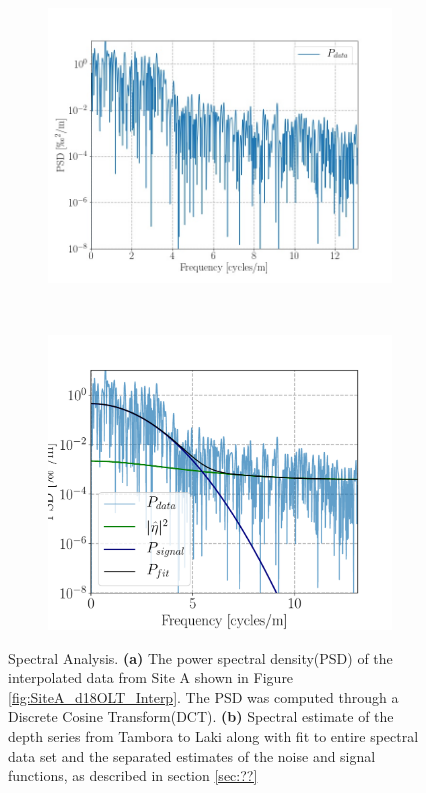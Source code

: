 \documentclass[../../CompleteThesis/Complete_1stDraft.tex]{subfiles}
\begin{document}
\begin{figure}[h]
	\centering
	\begin{subfigure}{.45\textwidth}
		\centering
		\includegraphics[width=\textwidth]{SiteA_DCT_PSD_raw.jpg}
		\caption[PSD of LT data, Site A]{}
		\label{fig:SiteA_DCT_PSD_raw}
	\end{subfigure}
	~
	\begin{subfigure}{0.45\textwidth}
		\includegraphics[width=\textwidth]{SiteA_PSD_all}
		\caption[Spectral fit, Site A]{}%
		\label{fig:SiteA_SpectralFitsAll}
	\end{subfigure}
	\caption[Spectral Analysis]{Spectral Analysis. \textbf{(a)} The power spectral density(PSD) of the interpolated data from Site A shown in Figure \ref{fig:SiteA_d18OLT_Interp}. The PSD was computed through a Discrete Cosine Transform(DCT). \textbf{(b)} Spectral estimate of the depth series from Tambora to Laki along with fit to entire spectral data set and the separated estimates of the noise and signal functions, as described in section \ref{sec:??}}
	\label{fig:SiteA_SpectralAnalysis}
\end{figure}
\end{document}

